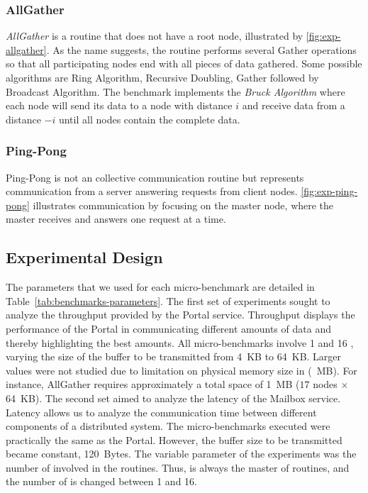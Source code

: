 			\subsubsection{AllGather}

				\textit{AllGather} is a routine that does not have a root node,
				illustrated by \autoref{fig:exp-allgather}. As the name suggests,
				the routine performs several Gather operations so that all
				participating nodes end with all pieces of data gathered. Some
				possible algorithms are Ring Algorithm, Recursive Doubling, Gather
				followed by Broadcast Algorithm. The benchmark implements the
				\textit{Bruck Algorithm} where each node will send its data to a
				node with distance $i$ and receive data from a distance $-i$ until
				all nodes contain the complete data.

			\subsubsection{Ping-Pong}

				Ping-Pong is not an \mpi collective communication routine but
				represents communication from a server answering requests from
				client nodes. \autoref{fig:exp-ping-pong} illustrates
				communication by focusing on the master node, where the master
				receives and answers one request at a time.

		\subsection{Experimental Design}
		\label{subsec:experimental-design}

			The parameters that we used for each micro-benchmark are detailed
			in Table~\ref{tab:benchmarks-parameters}.
			The first set of experiments sought to analyze the throughput
			provided by the Portal service. Throughput displays the performance
			of the Portal in communicating different amounts of data and
			thereby highlighting the best amounts. All micro-benchmarks involve
			1 \iocluster and 16 \cclusters, varying the size of the buffer to
			be transmitted from 4~KB to 64~KB. Larger values were not studied
			due to limitation on physical memory size in \cclusters (~MB).
			For instance, AllGather requires approximately a total space of
			1~MB ($17$ nodes $\times$ 64~KB).
			The second set aimed to analyze the latency of the Mailbox
			service. Latency allows us to analyze the communication time
			between different components of a distributed system. The
			micro-benchmarks executed were practically the same as the
			Portal. However, the buffer size to be transmitted became
			constant, 120~Bytes. The variable parameter of the experiments was
			the number of \cclusters involved in the routines.
			Thus, \iocluster is always the master of routines, and the number
			of \ccluster is changed between 1 and 16.

